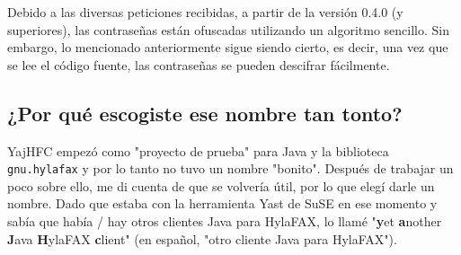 \documentclass[a4paper,10pt]{scrartcl}
\begin{document}
Debido a las diversas peticiones recibidas, a partir de la versión 0.4.0 (y superiores), las contraseñas están ofuscadas utilizando un algoritmo sencillo.
Sin embargo, lo mencionado anteriormente sigue siendo cierto, es decir, una vez que se lee el código fuente, las contraseñas se pueden descifrar fácilmente.

\subsection{¿Por qué escogiste ese nombre tan tonto?}

YajHFC empezó como "proyecto de prueba" para Java y la biblioteca \texttt{gnu.hylafax}
y por lo tanto no tuvo un nombre "bonito". Después de trabajar un poco sobre ello, me di cuenta de que se volvería útil, por lo que elegí darle un nombre.
Dado que estaba con la herramienta Yast de SuSE en ese momento y sabía 
que había / hay otros clientes Java para HylaFAX, lo llamé "\textbf{y}et \textbf{a}nother \textbf{J}ava \textbf{H}ylaFAX \textbf{c}lient" (en español, "otro cliente Java para HylaFAX").
 
\end{document}
